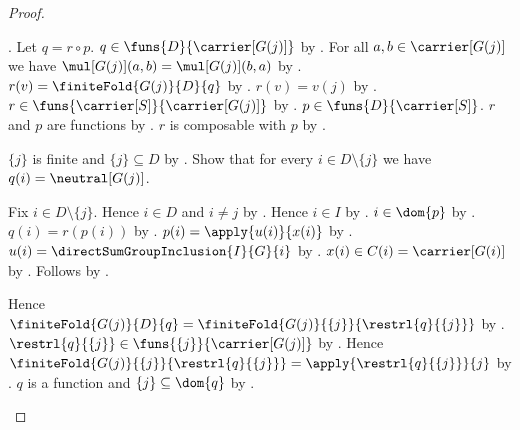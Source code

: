 \begin{proof}
\begin{subproof}
            .
        Let $q=r\circ p$.
        $q\in\funs{D}{\carrier[G(j)]}$ by
            .
        For all $a,b\in\carrier[G(j)]$ we have
            $\mul[G(j)](a,b)=\mul[G(j)](b,a)$ by
            .
        $r(v)=\finiteFold{G(j)}{D}{q}$ by
            .
        $r(v)=v(j)$ by .
        $r\in\funs{\carrier[S]}{\carrier[G(j)]}$ by
            .
        $p\in\funs{D}{\carrier[S]}$.
        $r$ and $p$ are functions by
            .
        $r$ is composable with $p$ by .
        \begin{byCase}
            $\{j\}$ is finite and $\{j\}\subseteq D$ by
                .
            Show that for every $i\in D\setminus\{j\}$ we have
                $q(i)=\neutral[G(j)]$.
            \begin{subproof}
                Fix $i\in D\setminus\{j\}$.
                Hence $i\in D$ and $i\neq j$ by
                    .
                Hence $i\in I$ by
                    .
                $i\in\dom{p}$ by .
                $q(i)=r(p(i))$ by .
                $p(i)=\apply{u(i)}{x(i)}$ by
                    .
                $u(i)=\directSumGroupInclusion{I}{G}{i}$ by
                    .
                $x(i)\in C(i)=\carrier[G(i)]$ by
                    .
                Follows by
                    .
            \end{subproof}
            Hence $\finiteFold{G(j)}{D}{q}
                =\finiteFold{G(j)}{\{j\}}{\restrl{q}{\{j\}}}$ by
                .
            $\restrl{q}{\{j\}}\in
                \funs{\{j\}}{\carrier[G(j)]}$ by
                .
            Hence $\finiteFold{G(j)}{\{j\}}{
                \restrl{q}{\{j\}}}
                =\apply{\restrl{q}{\{j\}}}{j}$ by
                .
            $q$ is a function and $\{j\}\subseteq\dom{q}$ by
                .

\end{byCase}
\end{subproof}
\end{proof}
